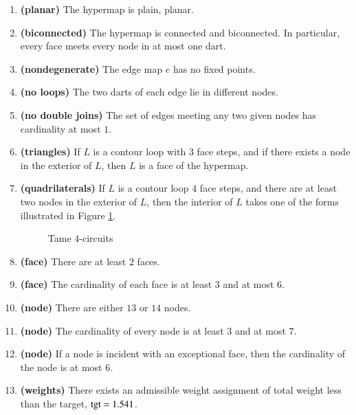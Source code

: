 \begin{enumerate}
    \label{definition:tame}
    \item {\bf (planar)} The hypermap is plain, planar.
    \item {\bf (biconnected)} The hypermap is connected and biconnected.  In particular, every face meets every node in at most one dart.
    \item {\bf (nondegenerate)} The edge map $e$ has no fixed points.
    \item {\bf (no loops)} The two darts of each edge lie in different nodes.
    \item {\bf (no double joins)} The set of edges meeting any two given nodes has cardinality at most $1$.
    \label{definition:tame:40}

    \item {\bf (triangles)} If $L$ is a contour loop with $3$ face steps, and if there exists a node in
    the exterior of $L$, then $L$ is a face of the hypermap.
    \label{definition:tame:3-circuit}

    \item {\bf (quadrilaterals)} If $L$ is a contour loop  $4$ face steps, and there are at least two nodes
    in the exterior of $L$, then the interior of $L$ takes one of the forms
    illustrated in Figure
    \ref{fig:fourcircuit}.
    \label{definition:tame:4-circuit}
    \begin{figure}[htb]
        \centering
        \caption{Tame $4$-circuits}
        \label{fig:fourcircuit}
    \end{figure}
  \item {\bf (face)} There are at least $2$ faces.
    \item {\bf (face)} The cardinality of each face is at least $3$ and at most $6$.
    \label{definition:tame:length}
    \item {\bf (node)} There are either $13$ or $14$ nodes.
    \item {\bf (node)} The cardinality of every node is at least $3$ and at most
    $7$.
    \label{definition:tame:degree}
    \item {\bf (node)} If a node is incident with an exceptional face,
        then the cardinality of the node is at most $6$.
    \label{definition:tame:degreeE}
    \item {\bf (weights)} There exists an admissible weight assignment
        of total weight less than the target, ${\operatorname{tgt}}=1.541$.
    \label{definition:tame:squander}
\end{enumerate}
%

